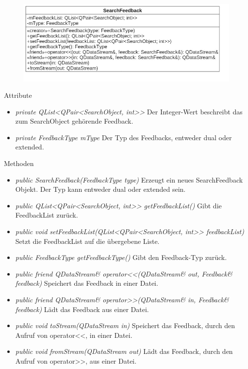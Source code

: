 \begin{figure}[H]
\centering
\includegraphics[scale=0.5]{img/Klassendiagramm/Klassen/Model/SearchFeedback}
\label{fig:searchFeedback}
\end{figure}

Attribute
\begin{itemize}
\item\textit{private QList<QPair<SearchObject, int>>} Der Integer-Wert beschreibt das zum SearchObject gehörende Feedback.
\item\textit{private FeedbackType mType} Der Typ des Feedbacks, entweder dual oder extended.
\end{itemize}

Methoden
\begin{itemize}
\item \textit{public SearchFeedback(FeedbackType type)} Erzeugt ein neues SearchFeedback Objekt. Der Typ kann entweder dual oder extended sein.
\item \textit{public QList<QPair<SearchObject, int>>  getFeedbackList()} Gibt die FeedbackList  zurück.
\item \textit{public void setFeedbackList(QList<QPair<SearchObject, int>> feedbackList)} Setzt die FeedbackList auf die übergebene Liste.
\item \textit{public FeedbackType getFeedbackType()} Gibt den Feedback-Typ zurück.
\item \textit{public friend QDataStream\& operator<<(QDataStream\& out, Feedback\& feedback)} Speichert das Feedback in einer Datei.
\item \textit{public friend QDataStream\& operator>>(QDataStream\& in, Feedback\& feedback)} Lädt das Feedback aus einer Datei.
\item \textit{public void toStream(QDataStream in)} Speichert das Feedback, durch den Aufruf von operator<<, in einer Datei.
\item \textit{public void fromStream(QDataStream out)} Lädt das Feedback, durch den Aufruf von operator>>, aus einer Datei.
\end{itemize} 

